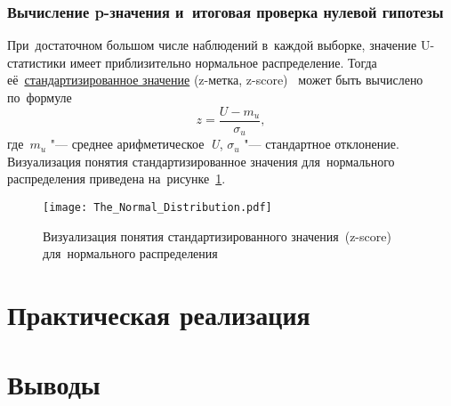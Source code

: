 \documentclass[]{scrartcl}
\begin{document}
\subsubsection{Вычисление p-значения и~итоговая проверка нулевой гипотезы}
При~достаточном большом числе наблюдений в~каждой выборке, значение U-статистики имеет приблизительно нормальное распределение. Тогда её~\href{https://en.wikipedia.org/wiki/Standard_score}{стандартизированное значение} (z-метка, \foreignlanguage{english}{z-score})~\cite{Wiki:z-score} может быть вычислено по~формуле
\begin{equation}\label{eq:z-score}
z = \frac{U-m_{u}}{\sigma_{u}},
\end{equation}
где~${\textstyle m_{u}}$ "--- среднее арифметическое~\textit{U}, ${\textstyle \sigma_{u}}$ "--- стандартное отклонение. Визуализация понятия стандартизированное значения для~нормального распределения приведена на~рисунке~\ref{fig:z-score}.
\begin{figure}[ht]
	\centering
	\texttt{[image: The\_Normal\_Distribution.pdf]}
	\caption{Визуализация понятия стандартизированного значения~(z-score) для~нормального распределения \cite{Wiki:z-score}}\label{fig:z-score}
\end{figure}
\section{Практическая реализация}

\section{Выводы}

\printbibliography[title=Источники информации]
\end{document}
